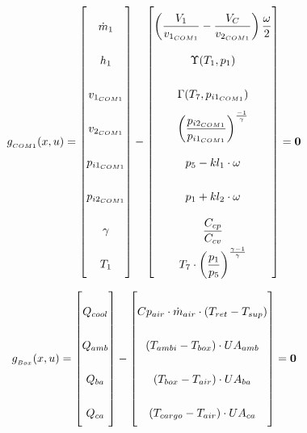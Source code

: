 \begin{equation} \label{eq:Gcs1}\renewcommand{\arraystretch}{2.5}
	g_{_{COM1}}(x,u) =  \begin{bmatrix}
		\dot{m}_1  		 	\\ %
		h_{1}				\\ %
		v_{1_{COM1}}			\\ %
		v_{2_{COM1}}			\\ %
		p_{i1_{COM1}}		\\ %
		p_{i2_{COM1}}		\\ %
		\gamma				\\ %
		T_{1}				\\ %
	\end{bmatrix}
	-
	\begin{bmatrix}
		\left(\dfrac{V_1}{v_{1_{COM1}}} - \dfrac{V_C}{v_{2_{COM1}}}\right) \dfrac{\omega}{2} \\			%
		\Upsilon(T_{1}, p_{1})		\\													%
		\Gamma(T_{7},p_{i1_{COM1}}) \\													%
		\left(\dfrac{p_{i2_{COM1}}}{p_{i1_{COM1}}}\right)^{\frac{-1}{\gamma}} \\		%
		p_{5} - kl_1 \cdot \omega \\													%
		p_{1} + kl_2 \cdot \omega \\													%
		\dfrac{C_{cp}}{C_{cv}} \\												%
		T_{7}\cdot \left(\dfrac{p_{1}}{p_{5}}\right)^{\frac{\gamma-1}{\gamma}}	\\		%
	\end{bmatrix}
	=\textbf{0}
\end{equation}


\begin{equation} \label{eq:Gbox}\renewcommand{\arraystretch}{2.5}
	g_{_{Box}}(x,u) =  \begin{bmatrix}
		Q_{cool}		\\ %
		Q_{amb}			\\ %
		Q_{ba}			\\ %
		Q_{ca}			\\ %
	\end{bmatrix}
	-
	\begin{bmatrix}
		Cp_{air} \cdot \dot{m}_{air} \cdot (T_{ret} - T_{sup})  \\	%
		(T_{ambi} - T_{box}) \cdot U A_{amb} 					\\	%
		(T_{box} - T_{air}) \cdot U A_{ba} 						\\	%
		(T_{cargo} - T_{air}) \cdot U A_{ca}				 	\\	%
	\end{bmatrix}
	=\textbf{0}
\end{equation}





